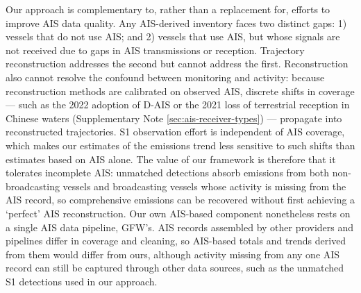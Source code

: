 \documentclass[lineno,pdflatex,sn-nature]{sn-jnl}
\begin{document}
Our approach is complementary to, rather than a replacement for, efforts to improve AIS data quality. Any AIS-derived inventory faces two distinct gaps: 1) vessels that do not use AIS; and 2) vessels that use AIS, but whose signals are not received due to gaps in AIS transmissions or reception. Trajectory reconstruction addresses the second but cannot address the first. Reconstruction also cannot resolve the confound between monitoring and activity: because reconstruction methods are calibrated on observed AIS, discrete shifts in coverage — such as the 2022 adoption of D-AIS or the 2021 loss of terrestrial reception in Chinese waters (Supplementary Note \ref{sec:ais-receiver-types}) — propagate into reconstructed trajectories. S1 observation effort is independent of AIS coverage, which makes our estimates of the emissions trend less sensitive to such shifts than estimates based on AIS alone. The value of our framework is therefore that it tolerates incomplete AIS: unmatched detections absorb emissions from both non-broadcasting vessels and broadcasting vessels whose activity is missing from the AIS record, so comprehensive emissions can be recovered without first achieving a `perfect' AIS reconstruction. Our own AIS-based component nonetheless rests on a single AIS data pipeline, GFW's. AIS records assembled by other providers and pipelines differ in coverage and cleaning, so AIS-based totals and trends derived from them would differ from ours, although activity missing from any one AIS record can still be captured through other data sources, such as the unmatched S1 detections used in our approach.
\end{document}
